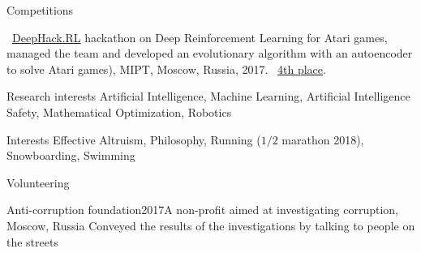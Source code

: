 \documentclass{resume} %
\begin{document}

\begin{rSection}{Competitions}
\vspace{-1em}
\item \faExternalLink~\href{http://web.archive.org/web/20170224094223/http://rl.deephack.me/}{DeepHack.RL} hackathon on Deep Reinforcement Learning for Atari games, managed the team and developed an evolutionary algorithm with an autoencoder to solve Atari games), MIPT, Moscow, Russia, 2017. \faExternalLink~\href{https://github.com/sergeivolodin/deephack.rl}{4th place}.
\end{rSection}

\begin{rSection}{Research interests}
	Artificial Intelligence, Machine Learning, Artificial Intelligence Safety, Mathematical Optimization, Robotics
\end{rSection}

\begin{rSection}{Interests}
	Effective Altruism, Philosophy, Running ($1/2$ marathon 2018), Snowboarding, Swimming
\end{rSection}

\begin{rSection}{Volunteering}
	\begin{rSubsection}{Anti-corruption foundation}{2017}{A non-profit aimed at investigating corruption, Moscow, Russia}{}
		 Conveyed the results of the investigations by talking to people on the streets
	\end{rSubsection}
\end{rSection}
\end{document}
